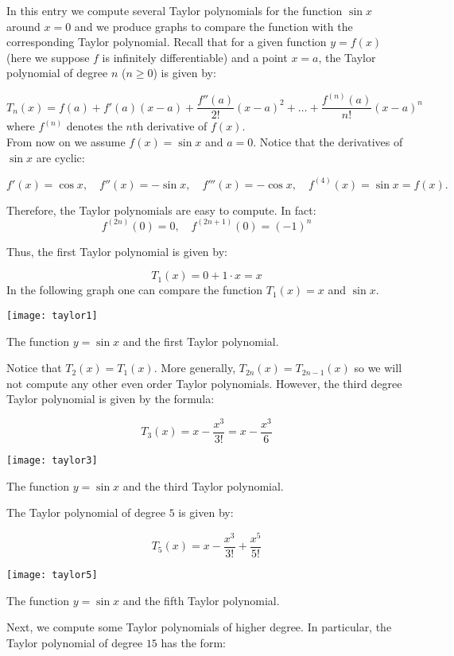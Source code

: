 \documentclass[12pt]{article}
\begin{document}
In this entry we compute several Taylor polynomials for the function $\sin x$ around $x=0$ and we produce graphs to compare the function with the corresponding Taylor polynomial. Recall that for a given function $y=f(x)$ (here we suppose $f$ is infinitely differentiable) and a point $x=a$, the Taylor polynomial of degree $n$ ($n\geq 0$) is given by:

$$T_n(x)=f(a)+f'(a)(x-a)+\frac{f''(a)}{2!}(x-a)^2+\ldots+\frac{f^{(n)}(a)}{n!}(x-a)^n$$
where $f^{(n)}$ denotes the $n$th derivative of $f(x)$. \\

From now on we assume $f(x)=\sin x$ and $a=0$. Notice that the derivatives of $\sin x$ are cyclic:

$$f'(x)=\cos x,\quad f''(x)=-\sin x, \quad f'''(x)=-\cos x, \quad f^{(4)}(x)=\sin x = f(x).$$

Therefore, the Taylor polynomials are easy to compute. In fact:
$$f^{(2n)}(0)=0, \quad f^{(2n+1)}(0)=(-1)^n$$

Thus, the first Taylor polynomial is given by:

$$T_1(x)= 0 + 1\cdot x = x$$
In the following graph one can compare the function $T_1(x)=x$ and $\sin x$.
\begin{center}
\texttt{[image: taylor1]}

The function $y=\sin x$ and the first Taylor polynomial.
\end{center}

Notice that $T_2(x)=T_1(x)$. More generally, $T_{2n}(x)=T_{2n-1}(x)$ so we will not compute any other even order Taylor polynomials. However, the third degree Taylor polynomial is given by the formula:

$$T_3(x)=x-\frac{x^3}{3!}=x - \frac{x^3}{6}$$

\begin{center}
\texttt{[image: taylor3]}

The function $y=\sin x$ and the third Taylor polynomial.
\end{center}

The Taylor polynomial of degree $5$ is given by:

$$T_5(x)=x-\frac{x^3}{3!}+\frac{x^5}{5!}$$

\begin{center}
\texttt{[image: taylor5]}

The function $y=\sin x$ and the fifth Taylor polynomial.
\end{center}

Next, we compute some Taylor polynomials of higher degree. In particular, the Taylor polynomial of degree $15$ has the form:
\end{document}
